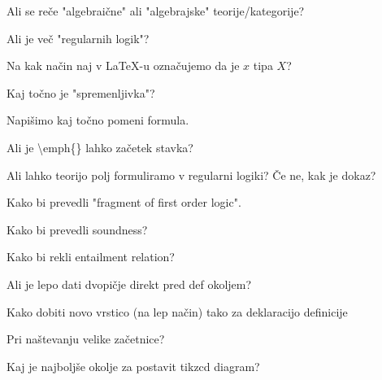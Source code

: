 \documentclass[12pt,a4paper]{article}
\newcommand\ans{\item[\textbf{A:}]}
\begin{document}
    \begin{vprasanja}
        \item Ali se reče "algebraične" ali "algebrajske" teorije/kategorije?
        \ans
        \item  Ali je več "regularnih logik"?
        \ans
        \item  Na kak način naj v \LaTeX -u označujemo da je $x$ tipa $X$?
        \ans
        \item  Kaj točno je "spremenljivka"?
        \ans
        \item  Napišimo kaj točno pomeni formula.
        \ans
        \item  Ali je \textbackslash emph\{\textasteriskcentered \} lahko začetek stavka?
        \ans
        \item  Ali lahko teorijo polj formuliramo v regularni logiki? Če ne, kak je dokaz?
        \ans
        \item  Kako bi prevedli "fragment of first order logic".
        \ans
        \item  Kako bi prevedli soundness?
        \ans
        \item  Kako bi rekli entailment relation?
        \ans
        \item Ali je lepo dati dvopičje direkt pred def okoljem?
        \ans
        \item Kako dobiti novo vrstico (na lep način) tako za deklaracijo definicije
        \ans 
        \item Pri naštevanju velike začetnice?
        \ans
        \item Kaj je najboljše okolje za postavit tikzcd diagram?
        \ans
    \end{vprasanja}
\end{document}
